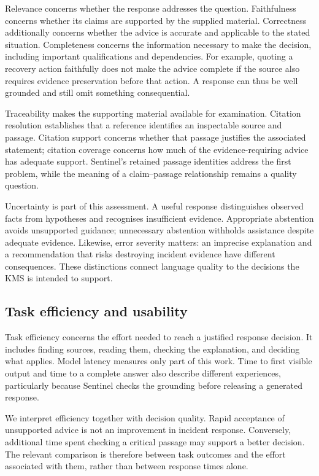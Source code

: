 Relevance concerns whether the response addresses the question. Faithfulness concerns whether its claims are supported by the supplied material. Correctness additionally concerns whether the advice is accurate and applicable to the stated situation. Completeness concerns the information necessary to make the decision, including important qualifications and dependencies. For example, quoting a recovery action faithfully does not make the advice complete if the source also requires evidence preservation before that action. A response can thus be well grounded and still omit something consequential.

Traceability makes the supporting material available for examination. Citation resolution establishes that a reference identifies an inspectable source and passage. Citation support concerns whether that passage justifies the associated statement; citation coverage concerns how much of the evidence-requiring advice has adequate support. Sentinel's retained passage identities address the first problem, while the meaning of a claim--passage relationship remains a quality question.

Uncertainty is part of this assessment. A useful response distinguishes observed facts from hypotheses and recognises insufficient evidence. Appropriate abstention avoids unsupported guidance; unnecessary abstention withholds assistance despite adequate evidence. Likewise, error severity matters: an imprecise explanation and a recommendation that risks destroying incident evidence have different consequences. These distinctions connect language quality to the decisions the KMS is intended to support.

\subsection{Task efficiency and usability}

Task efficiency concerns the effort needed to reach a justified response decision. It includes finding sources, reading them, checking the explanation, and deciding what applies. Model latency measures only part of this work. Time to first visible output and time to a complete answer also describe different experiences, particularly because Sentinel checks the grounding before releasing a generated response.

We interpret efficiency together with decision quality. Rapid acceptance of unsupported advice is not an improvement in incident response. Conversely, additional time spent checking a critical passage may support a better decision. The relevant comparison is therefore between task outcomes and the effort associated with them, rather than between response times alone.

